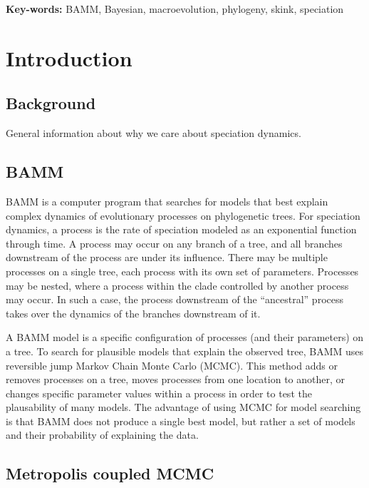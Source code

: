 \documentclass[12pt]{article}
\begin{document}
\begin{flushleft}
\textbf{Key-words:} BAMM, Bayesian, macroevolution, phylogeny, skink, speciation
\end{flushleft}


\pagebreak[4]


\section*{Introduction}

\subsection*{Background}

General information about why we care about speciation dynamics.


\subsection*{BAMM}

BAMM is a computer program that searches for models that best explain
complex dynamics of evolutionary processes on phylogenetic trees.
%
For speciation dynamics, a process is the rate of speciation
modeled as an exponential function through time.
%
A process may occur on any branch of a tree,
and all branches downstream of the process are under its influence.
%
There may be multiple processes on a single tree,
each process with its own set of parameters.
%
Processes may be nested, where a process within the clade
controlled by another process may occur.
%
In such a case, the process downstream of the ``ancestral'' process
takes over the dynamics of the branches downstream of it.


A BAMM model is a specific configuration of processes
(and their parameters) on a tree.
%
To search for plausible models that explain the observed tree,
BAMM uses reversible jump Markov Chain Monte Carlo (MCMC).
%
This method adds or removes processes on a tree,
moves processes from one location to another,
or changes specific parameter values within a process
in order to test the plausability of many models.
%
The advantage of using MCMC for model searching
is that BAMM does not produce a single best model,
but rather a set of models and their probability of explaining the data.


\subsection*{Metropolis coupled MCMC}
\end{document}
